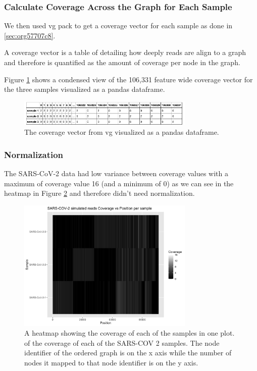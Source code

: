 \documentclass[10pt, a4paper]{article}
\begin{document}
\subsubsection{Calculate Coverage Across the Graph for Each Sample}
\label{sec:org5e78065}
We then used vg pack to get a coverage vector for each sample as done in 
\ref{sec:org57707c8}.

A coverage vector is a table of detailing how deeply reads are align to a 
graph and therefore is quantified as the amount of coverage per node in the graph.

Figure \ref{fig:org8c49b63} shows a condensed view of the 106,331 feature
wide coverage vector for the three samples visualized as a pandas dataframe.

\begin{figure}[h]
\centering
\includegraphics[width=0.75\textwidth]{../Figures/SARS_CoV_2/SARS_Coverage_Vector.png}
\caption[SARS-CoV-2 Coverage Vector]{\label{fig:org8c49b63}
The coverage vector from vg visualized as a pandas dataframe.}
\end{figure}

\subsubsection{Normalization}
\label{sec:org6369ccf}
The SARS-CoV-2 data had low variance between coverage values with a maximum of 
coverage value 16 (and a minimum of 0) as we can see in the heatmap in Figure
\ref{fig:org03a3bfd} and therefore didn’t need normalization.

\begin{figure}[h!]
\centering
\includegraphics[width=0.75\textwidth]{../Figures/SARS_CoV_2/Heatmap.png}
\caption[SARS-CoV-2 heatmap]{\label{fig:org03a3bfd}
A heatmap showing the coverage of each of the samples in one plot. of the coverage of each of the SARS-COV 2 samples. The node identifier of the ordered graph is on the x axis while the number of nodes it mapped to that node identifier is on the y axis.}
\end{figure}
\end{document}
